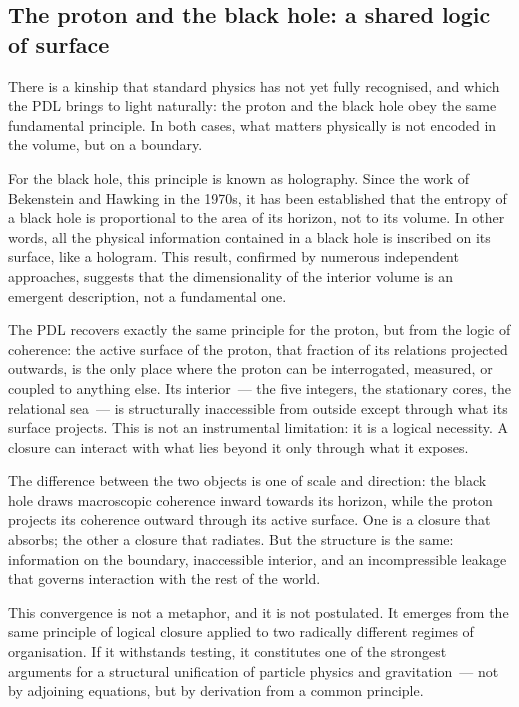 \documentclass[12pt, a4paper, openright]{book}
\begin{document}
\subsection*{The proton and the black hole: a shared logic of surface}

There is a kinship that standard physics has not yet fully recognised, and which the PDL brings to light naturally: the proton and the black hole obey the same fundamental principle. In both cases, what matters physically is not encoded in the volume, but on a boundary.

\medskip

For the black hole, this principle is known as holography. Since the work of Bekenstein and Hawking in the 1970s, it has been established that the entropy of a black hole is proportional to the area of its horizon, not to its volume. In other words, all the physical information contained in a black hole is inscribed on its surface, like a hologram. This result, confirmed by numerous independent approaches, suggests that the dimensionality of the interior volume is an emergent description, not a fundamental one.

\medskip

The PDL recovers exactly the same principle for the proton, but from the logic of coherence: the active surface of the proton, that fraction of its relations projected outwards, is the only place where the proton can be interrogated, measured, or coupled to anything else. Its interior~--- the five integers, the stationary cores, the relational sea~--- is structurally inaccessible from outside except through what its surface projects. This is not an instrumental limitation: it is a logical necessity. A closure can interact with what lies beyond it only through what it exposes.

\medskip

The difference between the two objects is one of scale and direction: the black hole draws macroscopic coherence inward towards its horizon, while the proton projects its coherence outward through its active surface. One is a closure that absorbs; the other a closure that radiates. But the structure is the same: information on the boundary, inaccessible interior, and an incompressible leakage that governs interaction with the rest of the world.

\medskip

This convergence is not a metaphor, and it is not postulated. It emerges from the same principle of logical closure applied to two radically different regimes of organisation. If it withstands testing, it constitutes one of the strongest arguments for a structural unification of particle physics and gravitation~--- not by adjoining equations, but by derivation from a common principle.
\end{document}
